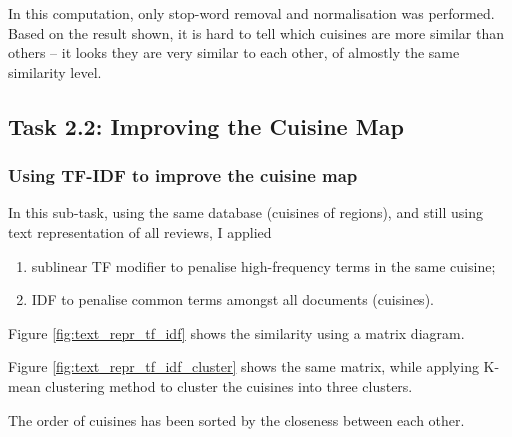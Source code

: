 \documentclass[11pt]{article}
\begin{document}
In this computation, only stop-word removal and normalisation was performed.
Based on the result shown, it is hard to tell which cuisines are more similar than others -- it looks they are very similar to each other, of almostly the same similarity level.

\subsection{Task 2.2: Improving the Cuisine Map}
\subsubsection{Using TF-IDF to improve the cuisine map}
In this sub-task, using the same database (cuisines of regions), and still using text representation of all reviews, I applied
\begin{enumerate}
    \item sublinear TF modifier to penalise high-frequency terms in the same cuisine;
    \item IDF to penalise common terms amongst all documents (cuisines).
\end{enumerate}


\vspace{1em}
Figure \ref{fig:text_repr_tf_idf} shows the similarity using a matrix diagram.

Figure \ref{fig:text_repr_tf_idf_cluster} shows the same matrix, while applying K-mean clustering method to cluster the cuisines into three clusters.

The order of cuisines has been sorted by the closeness between each other.
\end{document}
